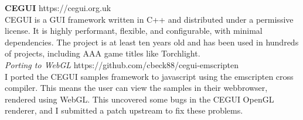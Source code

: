 \documentclass[margin,line]{resume}
\begin{document}
\begin{resume}
    \textbf{CEGUI} \hfill https://cegui.org.uk  \\
    CEGUI is a GUI framework written in C++ and distributed under a permissive license. It is highly performant,
    flexible, and configurable, with minimal dependencies. The project is at least ten years old and has been used 
    in hundreds of projects, including AAA game titles like Torchlight. \\
    \textsl{Porting to WebGL} \hfill https://github.com/cbeck88/cegui-emscripten \\
    I ported the CEGUI samples framework to javascript using the emscripten cross compiler.
    This means the user can view the samples in their webbrowser, rendered using WebGL. This uncovered some
    bugs in the CEGUI OpenGL renderer, and I submitted a patch upstream to fix these problems. \\


\end{resume}
\end{document}

